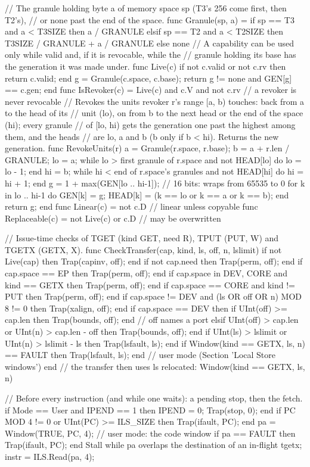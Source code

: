 \begin{pseudo}
// The granule holding byte a of memory space sp (T3's 256 come first, then T2's),
// or none past the end of the space.
func Granule(sp, a) = if sp == T3 and a < T3SIZE then a / GRANULE
                      elsif sp == T2 and a < T2SIZE then T3SIZE / GRANULE + a / GRANULE
                      else none
// A capability can be used only while valid and, if it is revocable, while the
// granule holding its base has the generation it was made under.
func Live(c)
    if not c.valid or not c.rv then return c.valid; end
    g = Granule(c.space, c.base);
    return g != none and GEN[g] == c.gen;
end
func IsRevoker(c)   = Live(c) and c.V and not c.rv   // a revoker is never revocable
// Revokes the units revoker r's range [a, b) touches: back from a to the head of its
// unit (lo), on from b to the next head or the end of the space (hi); every granule
// of [lo, hi) gets the generation one past the highest among them, and the heads
// are lo, a and b (b only if b < hi). Returns the new generation.
func RevokeUnits(r)
    a = Granule(r.space, r.base);  b = a + r.len / GRANULE;
    lo = a; while lo > first granule of r.space and not HEAD[lo] do lo = lo - 1; end
    hi = b; while hi < end of r.space's granules and not HEAD[hi] do hi = hi + 1; end
    g = 1 + max(GEN[lo .. hi-1]);           // 16 bits: wraps from 65535 to 0
    for k in lo .. hi-1 do GEN[k] = g; HEAD[k] = (k == lo or k == a or k == b); end
    return g;
end
func Linear(c)      = not c.D                  // linear unless copyable
func Replaceable(c) = not Live(c) or c.D       // may be overwritten

// Issue-time checks of TGET (kind GET, need R), TPUT (PUT, W) and TGETX (GETX, X).
func CheckTransfer(cap, kind, ls, off, n, lslimit)
    if not Live(cap) then Trap(capinv, off); end
    if not cap.need then Trap(perm, off); end
    if cap.space == EP then Trap(perm, off); end
    if cap.space in {DEV, CORE} and kind == GETX then Trap(perm, off); end
    if cap.space == CORE and kind != PUT then Trap(perm, off); end
    if cap.space != DEV and (ls OR off OR n) MOD 8 != 0 then Trap(xalign, off); end
    if cap.space == DEV then
        if UInt(off) >= cap.len then Trap(bounds, off); end      // off names a port
    elsif UInt(off) > cap.len or UInt(n) > cap.len - off then
        Trap(bounds, off);
    end
    if UInt(ls) > lslimit or UInt(n) > lslimit - ls then Trap(lsfault, ls); end
    if Window(kind == GETX, ls, n) == FAULT then Trap(lsfault, ls); end   // user mode (Section 'Local Store windows')
end                                 // the transfer then uses ls relocated: Window(kind == GETX, ls, n)

// Before every instruction (and while one waits): a pending stop, then the fetch.
if Mode == User and IPEND == 1 then IPEND = 0; Trap(stop, 0); end
if PC MOD 4 != 0 or UInt(PC) >= ILS_SIZE then Trap(ifault, PC); end
pa = Window(TRUE, PC, 4);                      // user mode: the code window
if pa == FAULT then Trap(ifault, PC); end
Stall while pa overlaps the destination of an in-flight tgetx;
instr = ILS.Read(pa, 4);
\end{pseudo}

